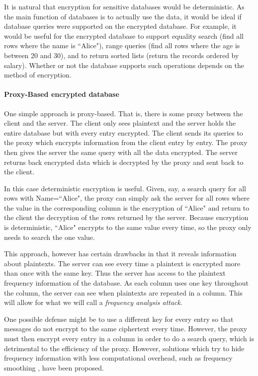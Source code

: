 It is natural that encryption for sensitive databases would be deterministic. As the main function of databases is to actually use the data, it would be ideal if database queries were supported on the encrypted database. For example, it would be useful for the encrypted database to support equality search (find all rows where the name is ``Alice"), range queries (find all rows where the age is between 20 and 30), and to return sorted lists (return the records ordered by salary). Whether or not the database supports such operations depends on the method of encryption. 

\paragraph{Proxy-Based encrypted database} One simple approach is proxy-based. That is, there is some proxy between the client and the server. The client only sees plaintext and the server holds the entire database but with every entry encrypted. The client sends its queries to the proxy which encrypts information from the client entry by entry. The proxy then gives the server the same query with all the data encrypted. The server returns back encrypted data which is decrypted by the proxy and sent back to the client. 

In this case deterministic encryption is useful. Given, say, a search query for all rows with Name=``Alice", the proxy can simply ask the server for all rows where the value in the corresponding column is the encryption of ``Alice" and return to the client the decryption of the rows returned by the server. Because encryption is deterministic, ``Alice" encrypts to the same value every time, so the proxy only needs to search the one value.

This approach, however has certain drawbacks in that it reveals information about plaintexts. The server can see every time a plaintext is encrypted more than once with the same key.
Thus the server has access to the plaintext frequency information of the database. As each column uses one key throughout the column, the server can see when plaintexts are repeated in a column.
This will allow for what we will call a \textit{frequency analysis attack}.
    
One possible defense might be to use a different key for every entry so that messages do not encrypt to the same ciphertext every time. However, the proxy must then encrypt every entry in a column in order to do a search query, which  is detrimental to the efficiency of the proxy. However, solutions which try to hide frequency information with less computational overhead, such as frequency smoothing \cite{Lacharite2018FSE}, have been proposed.

